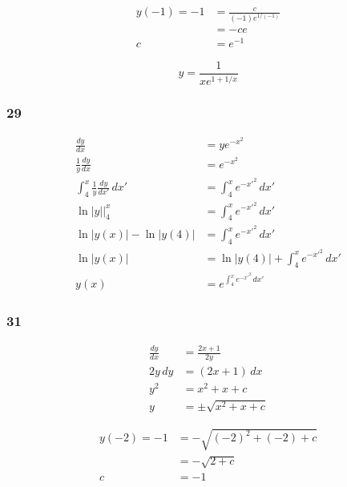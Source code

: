 \documentclass{article}
\begin{document}
\begin{align*}
  y(-1) = -1 & = \frac{c}{(-1) e^{1 / (-1)}} \\
             & = -c e                        \\
  c          & = e^{-1}
\end{align*}

\[y = \frac{1}{x e^{1 + 1 / x}}\]

\subsubsection{29}

\begin{align*}
  \frac{d y}{d x}                              & = y e^{-x^2}                             \\
  \frac{1}{y} \frac{d y}{d x}                  & = e^{-x^2}                               \\
  \int_4^x \frac{1}{y} \frac{d y}{d x'} \,d x' & = \int_4^x e^{-x'^2} \,d x'              \\
  \left. \ln |y| \right|_4^x                   & = \int_4^x e^{-x'^2} \,d x'              \\
  \ln |y(x)| - \ln |y(4)|                      & = \int_4^x e^{-x'^2} \,d x'              \\
  \ln |y(x)|                                   & = \ln |y(4)| + \int_4^x e^{-x'^2} \,d x' \\
  y(x)                                         & = e^{\int_4^x e^{-x'^2} \,d x'}
\end{align*}

\subsubsection{31}

\begin{align*}
  \frac{d y}{d x} & = \frac{2 x + 1}{2 y}    \\
  2 y \,d y       & = (2 x + 1) \,d x        \\
  y^2             & = x^2 + x + c            \\
  y               & = \pm \sqrt{x^2 + x + c}
\end{align*}

\begin{align*}
  y(-2) = -1 & = -\sqrt{(-2)^2 + (-2) + c} \\
             & = -\sqrt{2 + c}             \\
  c          & = -1
\end{align*}
\end{document}
